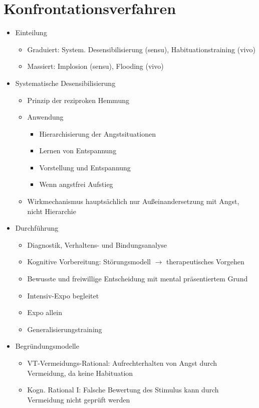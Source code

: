 \documentclass[11pt, paper=a4, twocolumn]{scrartcl}
\begin{document}
	\section{Konfrontationsverfahren}
		\begin{itemize}
			\item Einteilung
				\begin{itemize}
					\item Graduiert: System. Desensibilisierung (sensu), Habituationstraining (vivo)
					\item Massiert: Implosion (sensu), Flooding (vivo)
				\end{itemize}
			\item Systematische Desensibilisierung
				\begin{itemize}
					\item Prinzip der reziproken Hemmung
					\item Anwendung
						\begin{itemize}
							\item Hierarchisierung der Angstsituationen
							\item Lernen von Entspannung
							\item Vorstellung und Entspannung
							\item Wenn angstfrei Aufstieg
						\end{itemize}
					\item Wirkmechanismus hauptsächlich nur Außeinandersetzung mit Angst, nicht Hierarchie
				\end{itemize}
			\item Durchführung
				\begin{itemize}
					\item Diagnostik, Verhaltens- und Bindungsanalyse
					\item Kognitive Vorbereitung: Störungsmodell $\rightarrow$ therapeutisches Vorgehen
					\item Bewusste und freiwillige Entscheidung mit mental präsentiertem Grund
					\item Intensiv-Expo begleitet
					\item Expo allein
					\item Generalisierungstraining
				\end{itemize}
			\item Begründungsmodelle
				\begin{itemize}
					\item VT-Vermeidungs-Rational: Aufrechterhalten von Angst durch Vermeidung, da keine Habituation
					\item Kogn. Rational I: Falsche Bewertung des Stimulus kann durch Vermeidung nicht geprüft werden

\end{itemize}
\end{itemize}
\end{document}

